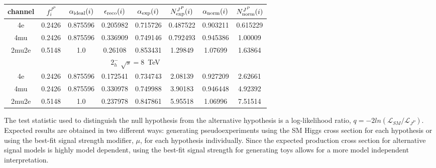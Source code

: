 \begin{table}[b]
\begin{tabular}{c c c c c c c c}
channel & $f_{i}^{J^P}$ & $\alpha_{\rm ideal} (i)$ & $\epsilon_{\rm reco} (i)$ & $\alpha_{\rm exp} (i)$ & $N^{J^P}_{\rm exp} (i)$ & $\alpha_{\rm norm} (i)$ & $N^{J^P}_{\rm norm} (i)$\\ \hline 
4e & 0.2426 & 0.875596 & 0.205982 & 0.715726
 & 0.487522%
 & 0.903211 & 0.615229 \\ \hline 
4mu & 0.2426 & 0.875596 & 0.336909 & 0.749146
 & 0.792493%
 & 0.945386 & 1.00009 \\ \hline 
2mu2e & 0.5148 & 1.0  & 0.26108 & 0.853431
 & 1.29849%
 & 1.07699 & 1.63864 \\ \hline \hline 

 \multicolumn{8}{|c|}{$2^{-}_{h}$ $\sqrt{s}=8$~TeV} \\ \hline 

4e & 0.2426 & 0.875596 & 0.172541 & 0.734743
 & 2.08139%
 & 0.927209 & 2.62661 \\ \hline 
4mu & 0.2426 & 0.875596 & 0.330978 & 0.749988
 & 3.90183%
 & 0.946448 & 4.92392 \\ \hline 
2mu2e & 0.5148 & 1.0  & 0.237978 & 0.847861
 & 5.95518%
 & 1.06996 & 7.51514 \\ \hline \hline 
\end{tabular}
\label{table:HZZ4lyieldcorr_spin2_HD}
\end{table}

The test statistic used to distinguish the null hypothesis from
the alternative hypothesis is a log-likelihood ratio,  
$q=-2ln(\mathscr{L}_{SM}/\mathscr{L}_{J^P})$. Expected results are
obtained in two different ways: generating pseudoexperiments using
the SM Higgs cross section for each hypothesis or using the best-fit signal strength modifier, $\mu$, for each
hypothesis individually.  Since the expected production cross 
section for alternative signal 
models is highly model dependent, using the best-fit signal
strength for generating toys allows for a more model independent 
interpretation.

